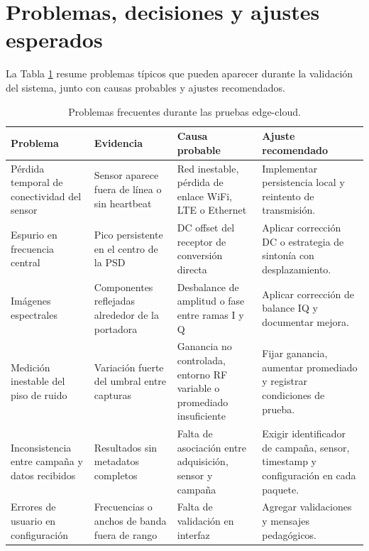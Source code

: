 \section{Problemas, decisiones y ajustes esperados}

La Tabla \ref{tab:problemas-pruebas-edge-cloud} resume problemas típicos que pueden aparecer durante la validación del sistema, junto con causas probables y ajustes recomendados.

\begin{table}[H]
\centering
\caption{Problemas frecuentes durante las pruebas edge-cloud.}
\label{tab:problemas-pruebas-edge-cloud}
\small
\setlength{\tabcolsep}{3pt}
\begin{tabularx}{\textwidth}{|>{\raggedright\arraybackslash}X|>{\raggedright\arraybackslash}X|>{\raggedright\arraybackslash}X|>{\raggedright\arraybackslash}X|}
\hline
\textbf{Problema} & \textbf{Evidencia} & \textbf{Causa probable} & \textbf{Ajuste recomendado} \\
\hline
Pérdida temporal de conectividad del sensor & Sensor aparece fuera de línea o sin heartbeat & Red inestable, pérdida de enlace WiFi, LTE o Ethernet & Implementar persistencia local y reintento de transmisión. \\
\hline
Espurio en frecuencia central & Pico persistente en el centro de la PSD & DC offset del receptor de conversión directa & Aplicar corrección DC o estrategia de sintonía con desplazamiento. \\
\hline
Imágenes espectrales & Componentes reflejadas alrededor de la portadora & Desbalance de amplitud o fase entre ramas I y Q & Aplicar corrección de balance IQ y documentar mejora. \\
\hline
Medición inestable del piso de ruido & Variación fuerte del umbral entre capturas & Ganancia no controlada, entorno RF variable o promediado insuficiente & Fijar ganancia, aumentar promediado y registrar condiciones de prueba. \\
\hline
Inconsistencia entre campaña y datos recibidos & Resultados sin metadatos completos & Falta de asociación entre adquisición, sensor y campaña & Exigir identificador de campaña, sensor, timestamp y configuración en cada paquete. \\
\hline
Errores de usuario en configuración & Frecuencias o anchos de banda fuera de rango & Falta de validación en interfaz & Agregar validaciones y mensajes pedagógicos. \\
\hline
\end{tabularx}
\end{table}

